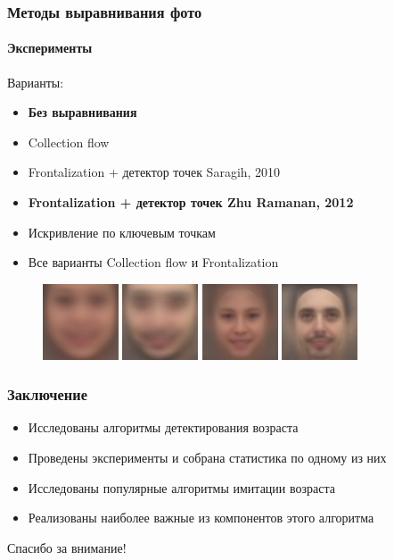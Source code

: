 \documentclass{beamer}
\begin{document}
  
  \begin{frame}
  	  \frametitle{Методы выравнивания фото}
  	  \framesubtitle{Эксперименты}
  	  Варианты:
	  \begin{itemize}
	  	\item \textbf{Без выравнивания}
	  	\item Collection flow
		\item Frontalization + детектор точек Saragih, 2010
		\item \textbf{Frontalization + детектор точек Zhu Ramanan, 2012}
		\item Искривление по ключевым точкам
		\item Все варианты Collection flow и Frontalization
	  \end{itemize}
	  \begin{figure}
	  	\includegraphics[width=0.2\textwidth]{results/all_no_mean.png}
	  	\includegraphics[width=0.2\textwidth]{results/id2_no_mean.png}
	  	\hspace{1.5em}
	  	\includegraphics[width=0.2\textwidth]{results/all_front_mean.png}
	  	\includegraphics[width=0.2\textwidth]{results/id2_front_mean.png}
	  \end{figure}
  \end{frame}
  
 
  \begin{frame}
  	  \frametitle{Заключение}
  	  \begin{itemize}
  	  	\item Исследованы алгоритмы детектирования возраста
  	  	\item Проведены эксперименты и собрана статистика по одному из них
		\item Исследованы популярные алгоритмы имитации возраста
		\item Реализованы наиболее важные из компонентов этого алгоритма
  	  \end{itemize}
  \end{frame}
  
  \begin{frame}
  	  \begin{center}
  	  Спасибо за внимание!
  	  \end{center}
  \end{frame}
  
\end{document}
